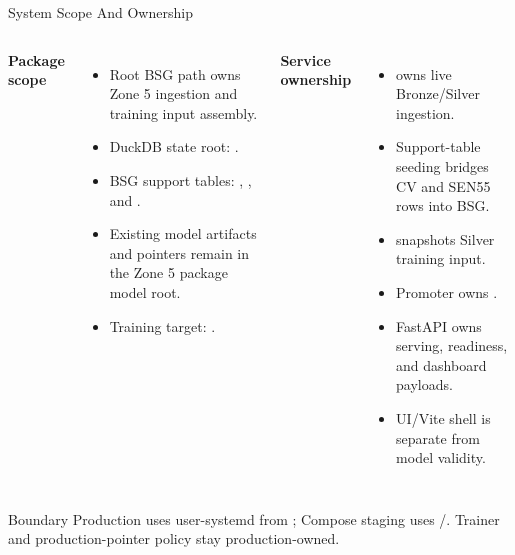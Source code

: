 \documentclass[aspectratio=169]{beamer}
\begin{document}
\begin{frame}[shrink=4]{System Scope And Ownership}
\begin{columns}[T,onlytextwidth]
\textbf{Package scope}
\begin{itemize}
  \item Root BSG path owns Zone 5 ingestion and training input assembly.
  \item DuckDB state root: .
  \item BSG support tables: , , and .
  \item Existing model artifacts and pointers remain in the Zone 5 package model root.
  \item Training target: .
\end{itemize}

\textbf{Service ownership}
\begin{itemize}
  \item {} owns live Bronze/Silver ingestion.
  \item Support-table seeding bridges CV and SEN55 rows into BSG.
  \item {} snapshots Silver training input.
  \item Promoter owns .
  \item FastAPI owns serving, readiness, and dashboard payloads.
  \item UI/Vite shell is separate from model validity.
\end{itemize}
\end{columns}
\tightsep
\begin{block}{Boundary}
\small Production uses user-systemd from ; Compose staging uses /.
Trainer and production-pointer policy stay production-owned.
\end{block}
\end{frame}
\end{document}
